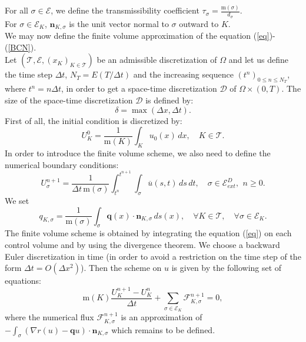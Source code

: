 \documentclass[smallextended]{svjour3}
\newcommand{\ds}{\displaystyle}
\def\ukn{U_{K}^{n}}
\def\uknp{U_{K}^{n+1}}
\begin{document}
For all $\sigma \in \mathcal{E}$, we define the transmissibility coefficient $\ds{\tau_{\sigma}=\frac{\text{m}(\sigma)}{d_{\sigma}}.}$\\
For $\sigma \in \mathcal{E}_{K}$, $\mathbf{n}_{K,\sigma}$ is the unit vector normal to $\sigma$ outward to $K$.\\
We may now define the finite volume approximation of the equation (\ref{eq})-(\ref{BCN}).\\
Let $(\mathcal{T},\mathcal{E},(x_{K})_{K \in \mathcal{T}})$ be an admissible discretization of $\Omega$ and let us define the time step $\Delta t$, $N_{T}=E(T/\Delta t)$ and the increasing sequence $(t^{n})_{0\leq n \leq N_{T}}$, where $t^{n}=n\Delta t$, in order to get a space-time discretization $\mathcal{D}$ of $\Omega \times (0,T)$. The size of the space-time discretization $\mathcal{D}$ is defined by:
\begin{equation*}
\delta =\max(\Delta x, \Delta t).
\end{equation*}
First of all, the initial condition is discretized by:
\begin{equation}
U^{0}_{K}=\frac{1}{\text{m}(K)}\int_{K}u_{0}(x)\,dx, \quad K \in \mathcal{T}.
\label{CId}
\end{equation}
In order to introduce the finite volume scheme, we also need to define the numerical boundary conditions:
\begin{equation}
U^{n+1}_{\sigma}=\frac{1}{\Delta t \, \text{m}(\sigma)}\int_{t^{n}}^{t^{n+1}}\int_{\sigma}\overline{u}(s,t)\,ds \, dt, \quad \sigma \in \mathcal{E}_{ext}^{D}, \,\ n\geq 0.
\label{BCd}
\end{equation}
We set 
\begin{equation}
q_{K,\sigma}=\frac{1}{\text{m}(\sigma)}\int_{\sigma}\mathbf{q}(x)\cdot \mathbf{n}_{K,\sigma}\,ds(x), \quad \forall K \in \mathcal{T}, \quad \forall \sigma \in \mathcal{E}_{K}.
\label{q}
\end{equation}
The finite volume scheme is obtained by integrating the equation (\ref{eq}) on each control volume and by using the divergence theorem. We choose a backward Euler discretization in time (in order to avoid a restriction on the time step of the form $\Delta t=O(\Delta x^{2})$). Then the scheme on $u$ is given by the following set of equations:
\begin{equation}
\text{m}(K)\frac{\uknp-\ukn}{\Delta t}+\sum_{\sigma \in \mathcal{E}_{K}} \mathcal{F}_{K,\sigma}^{n+1}=0,
\label{schemegene}
\end{equation}
where the numerical flux $\mathcal{F}_{K,\sigma}^{n+1}$ is an approximation of $\ds{-\int_{\sigma} (\nabla r(u)-\mathbf{q}u)\cdot \mathbf{n}_{K,\sigma}}$ which remains to be defined.
\end{document}

